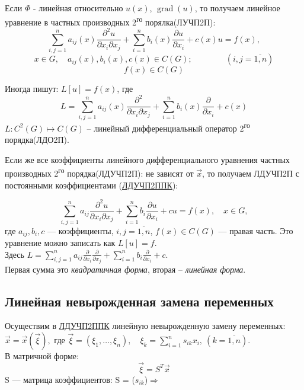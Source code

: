 \begin{note}
	Если $\Phi$ - линейная относительно $u(x)$, $\operatorname{grad}(u)$, то получаем линейное уравнение в частных производных 2\textsuperscript{го} порялка(ЛУЧП2П):
	$$\sum_{i,j=1}^{n} a_{ij}(x)\frac{\partial^2u}{\partial x_i \partial x_j} + \sum_{i=1}^{n} b_{i}(x)\frac{\partial u}{\partial x_i} + c(x)u = f(x),$$
	\[
		x \in G,\quad a_{ij}(x), b_i(x), c(x) \in C(G); \qquad\qquad (i,j = \overline{1,n})
	\]
	$$f(x) \in C(G)$$
\end{note}
Иногда пишут:
$L[u]=f(x)$, где
$$\displaystyle L= \sum_{i,j=1}^{n} a_{ij}(x)\frac{\partial^2}{\partial x_i \partial x_j} + \sum_{i=1}^{n} b_{i}(x)\frac{\partial }{\partial x_i} + c(x)$$
$\displaystyle L: C^2(G)\mapsto C(G)$ -- линейный дифференциальный оператор 2\textsuperscript{го} порядка(ЛДО2П).\par\medskip

\label{abbr:LDUChPSPPK}
\newcommand{\LDUChPSPPK}{\hyperref[abbr:LDUChPSPPK]{ЛДУЧП2ППК}}
Если же все коэффициенты линейного дифференциального уравнения частных производных 2\textsuperscript{го} порядка(ЛДУЧП2П): не зависят от $\vec x$, то получаем ЛДУЧП2П с постоянными коэффициентами (\LDUChPSPPK{}):

\[
	\sum_{i,j=1}^{n} a_{ij}\frac{\partial^2u}{\partial x_i \partial x_j} + \sum_{i=1}^{n} b_{i}\frac{\partial u}{\partial x_i} + cu = f(x), \quad x \in G,
\]
где \(a_{ij}, b_i, c\) --- коэффициенты, \(i,j = \overline{1,n}\), \(f(x) \in C(G)\) --- правая часть. Это уравнение можно записать как \(L[u]=f\).\\
Здесь
$\displaystyle L=
	\sum_{i,j=1}^{n} a_{ij}\frac{\partial}{\partial x_i} \frac{\partial}{\partial x_j}
	+\sum_{i=1}^{n} b_{i}\frac{\partial }{\partial x_i} + c$.\\ Первая сумма это \emph{квадратичная форма}, вторая -- \emph{линейная форма}.
\subsection{Линейная невырожденная замена переменных}
Осуществим в \LDUChPSPPK{} линейную невырожденную замену переменных:\\
$\displaystyle\vec x=\vec x(\vec \xi),$ где $\displaystyle\vec \xi=(\xi_1, \ldots, \xi_n),\quad \xi_k = \sum_{i=1}^{n}s_{ik}x_i,\ (k=\overline{1,n})$.\\
В матричной форме: $$\vec \xi = S^T \vec x$$
S --- матрица коэффициентов: S = ($s_{ik}$)$\Rightarrow$

